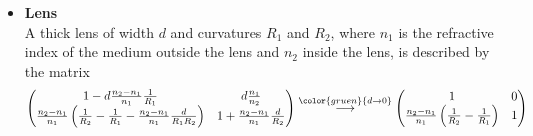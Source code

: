 \documentclass{article}
\newcommand{\lr}[1]{\left(#1\right)}
\newcommand{\comment}[1]{{\color{gruen} {#1}}}
\begin{document}
\begin{itemize}
		where $R>0$ for a convex and $R<0$ for a concave mirror.


		\item \textbf{Lens}\\
		A thick lens of width $d$ and curvatures $R_1$ and $R_2$, where $n_1$ is the refractive index of the medium outside the lens and $n_2$ inside the lens, is described by the matrix
			\begin{equation}
				\begin{pmatrix}
					1 - d \frac{n_2-n_1}{n_1}\frac{1}{R_1} & d \frac{n_1}{n_2} \\
					\frac{n_2-n_1}{n_1} \lr{ \frac{1}{R_2} - \frac{1}{R_1} - \frac{n_2-n_1}{n_1}\frac{d}{R_1 R_2} } & 1 + \frac{n_2-n_1}{n_1}\frac{d}{R_2}
				\end{pmatrix}
				\stackrel{\comment{d\to 0}}{\longrightarrow}
				\begin{pmatrix}
					1 & 0 \\
					\frac{n_2-n_1}{n_1} \lr{ \frac{1}{R_2} - \frac{1}{R_1} } & 1
				\end{pmatrix}
			\end{equation}
	\end{itemize}


\newpage
\end{document}
